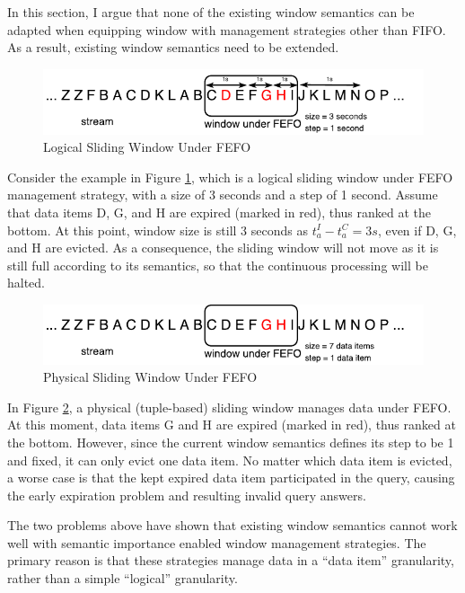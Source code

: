 In this section, I argue that none of the existing window semantics can be adapted when equipping window with management strategies other than FIFO.  
As a result, existing window semantics need to be extended. 

\begin{figure}[!htbp]
	\centering
    \includegraphics[width=5in]{img/3-wsti.pdf}
    \caption{Logical Sliding Window Under FEFO}
    \label{fig:3-wsti}
\end{figure}

Consider the example in Figure \ref{fig:3-wsti}, which is a logical sliding window under FEFO management strategy, with a size of 3 seconds and a step of 1 second. 
Assume that data items D, G, and H are expired (marked in red), thus ranked at the bottom. 
At this point, window size is still 3 seconds as $t^{I}_{a} - t^{C}_{a} = 3s$, even if D, G, and H are evicted.  
As a consequence, the sliding window will not move as it is still full according to its semantics, so that the continuous processing will be halted. 

\begin{figure}[!htbp]
	\centering
    \includegraphics[width=5in]{img/3-wstu.pdf}
    \caption{Physical Sliding Window Under FEFO}
    \label{fig:3-wstu}
\end{figure}

In Figure \ref{fig:3-wstu}, a physical (tuple-based) sliding window manages data under FEFO. 
At this moment, data items G and H are expired (marked in red), thus ranked at the bottom. 
However, since the current window semantics defines its step to be 1 and fixed, it can only evict one data item. 
No matter which data item is evicted, a worse case is that the kept expired data item participated in the query, causing the early expiration problem and resulting invalid query answers. 

The two problems above have shown that existing window semantics cannot work well with semantic importance enabled window management strategies. 
The primary reason is that these strategies manage data in a ``data item'' granularity, rather than a simple ``logical'' granularity. 
%

